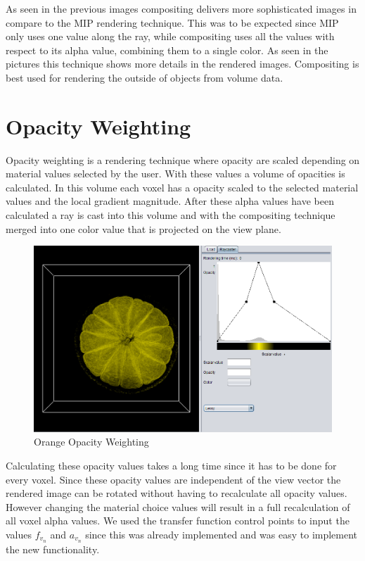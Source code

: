\documentclass[a4paper,twoside,11pt]{article}
\begin{document}
As seen in the previous images compositing delivers more sophisticated images in compare to the MIP rendering technique. This was to be expected since MIP only uses one value along the ray, while compositing uses all the values with respect to its alpha value, combining them to a single color. As seen in the pictures this technique shows more details in the rendered images. \newline
Compositing is best used for rendering the outside of objects from volume data.

\newpage

\section{Opacity Weighting}
Opacity weighting is a rendering technique where opacity are scaled depending on material values selected by the user. With these values a volume of opacities is calculated. In this volume each voxel has a opacity scaled to the selected material values and the local gradient magnitude. After these alpha values have been calculated a ray is cast into this volume and with the compositing technique merged into one color value that is projected on the view plane.
\begin{figure}[h!]
    \includegraphics[width=\textwidth]{Images/OrangeOW.png}
    \caption{Orange Opacity Weighting}
    \label{fig:BonsaiOW}
\end{figure}
Calculating these opacity values takes a long time since it has to be done for every voxel. Since these opacity values are independent of the view vector the rendered image can be rotated without having to recalculate all opacity values. However changing the material choice values will result in a full recalculation of all voxel alpha values. We used the transfer function control points to input the values $f_{v_{n}}$ and $a_{v_{n}}$ since this was already implemented and was easy to implement the new functionality. \newpage
\end{document}
